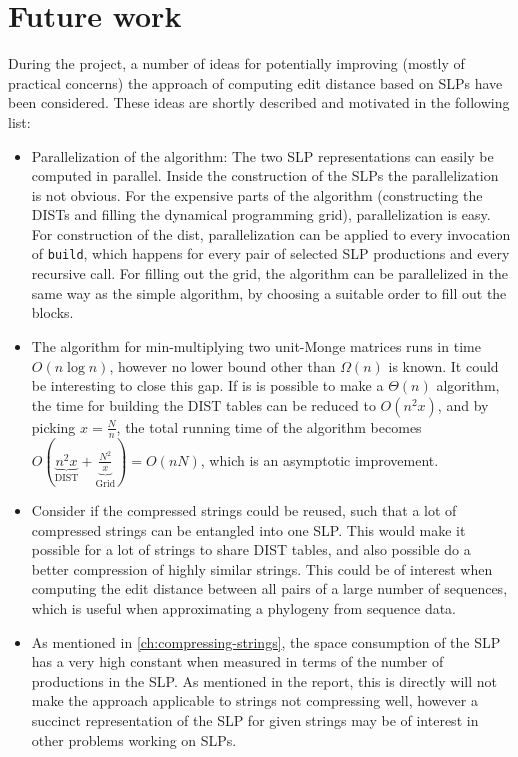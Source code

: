 \documentclass[twoside,11pt,openright]{report}
\newcommand{\DIST}{\operatorname{DIST}}
\begin{document}
\section{Future work}
\label{sec:conclusion:future-work}
During the project, a number of ideas for potentially improving (mostly of practical concerns) the approach of computing edit distance based on SLPs have been considered. These ideas are shortly described and motivated in the following list:

\begin{itemize}
  \item Parallelization of the algorithm: The two SLP representations can easily be computed in parallel. Inside the construction of the SLPs the parallelization is not obvious.
  For the expensive parts of the algorithm (constructing the DISTs and filling the dynamical programming grid), parallelization is easy. For construction of the dist, parallelization can be applied to every invocation of \texttt{build}, which happens for every pair of selected SLP productions and every recursive call.
  For filling out the grid, the algorithm can be parallelized in the same way as the simple algorithm, by choosing a suitable order to fill out the blocks.

  \item The algorithm for min-multiplying two unit-Monge matrices runs in time $O(n \log{n})$, however no lower bound other than $\Omega(n)$ is known. It could be interesting to close this gap. If is is possible to make a $\Theta(n)$ algorithm, the time for building the DIST tables can be reduced to $O(n^2 x)$, and by picking $x = \frac{N}{n}$, the total running time of the algorithm becomes $O(\underbrace{n^2 x}_{\DIST} + \underbrace{\frac{N^2}{x}}_{\text{Grid}}) = O(nN)$, which is an asymptotic improvement.

  \item Consider if the compressed strings could be reused, such that a lot of compressed strings can be entangled into one SLP. This would make it possible for a lot of strings to share DIST tables, and also possible do a better compression of highly similar strings. This could be of interest when computing the edit distance between all pairs of a large number of sequences, which is useful when approximating a phylogeny from sequence data.

  \item As mentioned in \cref{ch:compressing-strings}, the space consumption of the SLP has a very high constant when measured in terms of the number of productions in the SLP. As mentioned in the report, this is directly will not make the approach applicable to strings not compressing well, however a succinct representation of the SLP for given strings may be of interest in other problems working on SLPs.
\end{itemize}


 

\end{document}
